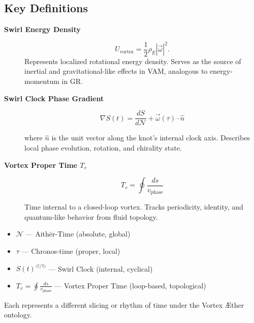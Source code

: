\documentclass[12pt]{article}
\begin{document}

    \subsection*{Key Definitions}

    \begin{description}

        \item[\textbf{Swirl Energy Density}]%
        \[
            U_{\text{vortex}} = \frac{1}{2} \rho_{\scriptscriptstyle\boldsymbol\!E} |\vec{\omega}|^2.
        \]
        Represents localized rotational energy density. Serves as the source of inertial and gravitational-like effects in VAM, analogous to energy-momentum in GR.

        \item[\textbf{Swirl Clock Phase Gradient}]%

        \begin{equation}
            \boxed{
                \nabla S(t) = \frac{dS}{d\mathcal{N}} + \vec{\omega}(\tau) \cdot \hat{n}
            }
            \label{eq:swirl-clock-gradient}
        \end{equation}

        where \( \hat{n} \) is the unit vector along the knot’s internal clock axis. Describes local phase evolution, rotation, and chirality state.

        \item[\textbf{Vortex Proper Time \( T_v \)}]%

        \begin{equation}
            \boxed{
                T_v = \oint \frac{ds}{v_\text{phase}}
            }
            \label{eq:vortex-proper-time}
        \end{equation}

        Time internal to a closed-loop vortex. Tracks periodicity, identity, and quantum-like behavior from fluid topology.
    \end{description}


    \begin{tcolorbox}[title=Key Temporal Variables in VAM]
        \begin{itemize}
            \item \( \mathcal{N} \) — Aithēr-Time (absolute, global)
            \item \( \tau \) — Chronos-time (proper, local)
            \item \( S(t)^{\circlearrowleft/\circlearrowright} \) — Swirl Clock (internal, cyclical)
            \item \( T_v = \oint \frac{ds}{v_{\text{phase}}} \) — Vortex Proper Time (loop-based, topological)
        \end{itemize}
        Each represents a different slicing or rhythm of time under the Vortex Æther ontology.
    \end{tcolorbox}
\end{document}
